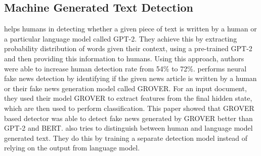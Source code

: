 \subsection{Machine Generated Text Detection}
\cite{gehrmann2019gltr} helps humans in detecting whether a given piece of text is written by a human or a particular language model called GPT-2.
%
They achieve this by extracting probability distribution of words given their context, using a pre-trained GPT-2 \cite{radford2019language} and then providing this information to humans.
%
Using this approach, authors were able to increase human detection rate from 54\% to 72\%.
\cite{zellers2019defending} performs neural fake news detection by identifying if the given news article is written by a human or their fake news generation model called GROVER.
%
For an input document, they used their model GROVER to extract features from the final hidden state, which are then used to perform classification.
%
This paper showed that GROVER based detector was able to detect fake news generated by GROVER better than GPT-2 and BERT.
%
\cite{bakhtin2019real} also tries to distinguish between human and language model generated text.
%
They do this by training a separate detection model instead of relying on the output from language model.




%


